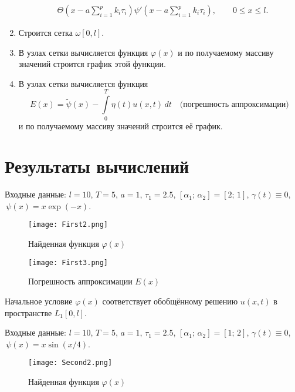 \documentclass{article}
\renewcommand{\le}{\leqslant}
\theoremstyle{definition}
\begin{document}
\begin{enumerate}
\begin{equation*}
\begin{aligned}
	& \Theta\!\left(x - a\sum\limits_{i = 1}^{p}k_i\tau_i \right)\psi'\!\left(x - a\sum\limits_{i = 1}^{p}k_i\tau_i\right), 
	\qquad 0 \le x \le l.
	\end{aligned}
	\end{equation*}
	\item Строится сетка $\omega[0,l]$. 
	\item В узлах сетки вычисляется функция $\varphi(x)$ и по получаемому массиву значений 
	строится график этой функции.
	\item В узлах сетки вычисляется функция
	\begin{equation*}
		E(x) = \widetilde{\psi}(x) - \int\limits_0^T \eta(t)u(x,t) \,dt \quad \text{(погрешность аппроксимации)}
	\end{equation*}
	и по получаемому массиву значений строится её график.
\end{enumerate}

\newpage

\section{Результаты вычислений}

Входные данные:
$l = 10$,  $T = 5$,  $a = 1$, $\tau_1 = 2.5$, $[\alpha_1;\, \alpha_2] = [2;\, 1]$, 
$\gamma(t) \equiv 0$, $\,\psi(x) = x\exp(-x)$.
\begin{figure}[H]
	\centering
	\texttt{[image: First2.png]}
	\caption{Найденная функция $\varphi(x)$}
	\label{fig:image2}
\end{figure}

\begin{figure}[H]
	\centering
	\texttt{[image: First3.png]}
	\caption{Погрешность аппроксимации $E(x)$}
	\label{fig:image1}
\end{figure}

Начальное условие $\varphi(x)$ соответствует обобщённому решению $u(x,t)$ в пространстве $L_1[0,l]$.
\goodbreak
\newpage	

Входные данные: 
$l = 10$,  $T = 5$,  $a = 1$, $\tau_1 = 2.5$, $[\alpha_1;\, \alpha_2] = [1;\, 2]$, 
$\gamma(t) \equiv 0$, $\,\psi(x) = x \sin(x/4)$.
\begin{figure}[H]
	\centering
	\texttt{[image: Second2.png]}
	\caption{Найденная функция $\varphi(x)$}
	\label{fig:image4}
\end{figure}
\end{document}
